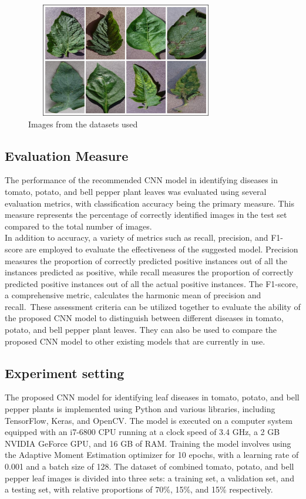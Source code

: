 \documentclass[conference]{IEEEtran}
\begin{document}
 \begin{figure}[H]
 \includegraphics[width=8.8cm, height=5cm]{dataset.jpg}
\caption{Images from the datasets used}
\label{fig: Figure 2}
\end{figure}
 
\subsection{Evaluation Measure}
The performance of the recommended CNN model in identifying diseases in tomato, potato, and bell pepper plant leaves was evaluated using several evaluation metrics, with classification accuracy being the primary measure. This measure represents the percentage of correctly identified images in the test set compared to the total number of images.\\ 


In addition to accuracy, a variety of metrics such as recall, precision, and F1-score are employed to evaluate the effectiveness of the suggested model. Precision measures the proportion of correctly predicted positive instances out of all the instances predicted as positive, while recall measures the proportion of correctly predicted positive instances out of all the actual positive instances. The F1-score, a comprehensive metric, calculates the harmonic mean of precision and recall.\
These assessment criteria can be utilized together to evaluate the ability of the proposed CNN model to distinguish between different diseases in tomato, potato, and bell pepper plant leaves. They can also be used to compare the proposed CNN model to other existing models that are currently in use.

\subsection{Experiment setting} 
The proposed CNN model for identifying leaf diseases in tomato, potato, and bell pepper plants is implemented using Python and various libraries, including TensorFlow, Keras, and OpenCV. The model is executed on a computer system equipped with an i7-6800 CPU running at a clock speed of 3.4 GHz, a 2 GB NVIDIA GeForce GPU, and 16 GB of RAM. Training the model involves using the Adaptive Moment Estimation optimizer for 10 epochs, with a learning rate of 0.001 and a batch size of 128. The dataset of combined tomato, potato, and bell pepper leaf images is divided into three sets: a training set, a validation set, and a testing set, with relative proportions of 70\%, 15\%, and 15\% respectively.
\end{document}
